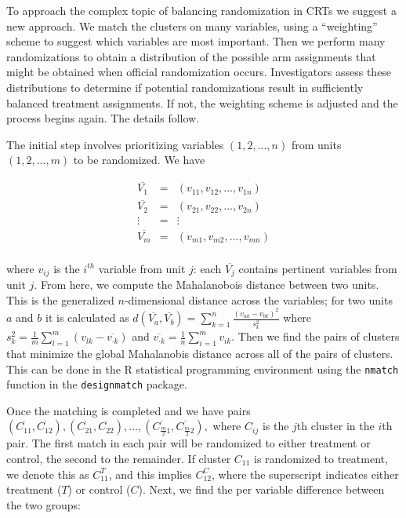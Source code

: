 \documentclass[]{article}
\begin{document}
To approach the complex topic of balancing randomization in CRTs we
suggest a new approach. We match the clusters on many variables, using a
``weighting'' scheme to suggest which variables are most important. Then
we perform many randomizations to obtain a distribution of the possible
arm assignments that might be obtained when official randomization
occurs. Investigators assess these distributions to determine if
potential randomizations result in sufficiently balanced treatment
assignments. If not, the weighting scheme is adjusted and the process
begins again. The details follow.

The initial step involves prioritizing variables \((1, 2,..., n)\) from
units \((1, 2, ..., m)\) to be randomized. We have

\begin{eqnarray*}
 \overline{V_1} & = & (v_{11}, v_{12},..., v_{1n})\\
 \overline{V_2} & = & (v_{21}, v_{22},..., v_{2n})\\
 \vdots & = & \vdots\\    
 \overline{V_m} & = & (v_{m1}, v_{m2},..., v_{mn})\\
\end{eqnarray*}

where \(v_{ij}\) is the \(i^{th}\) variable from unit \(j\): each
\(\overline{V_j}\) contains pertinent variables from unit \(j\). From
here, we compute the Mahalanobois distance between two units. This is
the generalized \(n\)-dimensional distance across the variables; for two
units \(a\) and \(b\) it is calculated as
\(d(\overline{V_a}, \overline{V_b}) = \sum_{k=1}^n \frac{(v_{ak} - v_{bk})^2}{s_k^2}\)
where
\(s_k^2 = \frac{1}{m} \sum_{l=1}^m(v_{lk} - \overline{v_{\cdot k}})\)
and \(\overline{v_{\cdot k}} = \frac{1}{n} \sum_{i = 1}^m v_{ik}\). Then
we find the pairs of clusters that minimize the global Mahalanobis
distance across all of the pairs of clusters. This can be done in the R
statistical programming environment \citep{R} using the \texttt{nmatch}
function in the \texttt{designmatch} \citep{nmatch} package.

Once the matching is completed and we have pairs
\((\overline{C_{11}}, \overline{C_{12}}), (\overline{C_{21}}, \overline{C_{22}}), ..., (\overline{C_{\frac{m}{2}1}}, \overline{C_{\frac{m}{2}2}}),\)
where \(C_{ij}\) is the \(j\)th cluster in the \(i\)th pair. The first
match in each pair will be randomized to either treatment or control,
the second to the remainder. If cluster \(C_{11}\) is randomized to
treatment, we denote this as \(C_{11}^T\), and this implies
\(C_{12}^C\), where the superscript indicates either treatment (\(T\))
or control (\(C\)). Next, we find the per variable difference between
the two groups:
\end{document}
